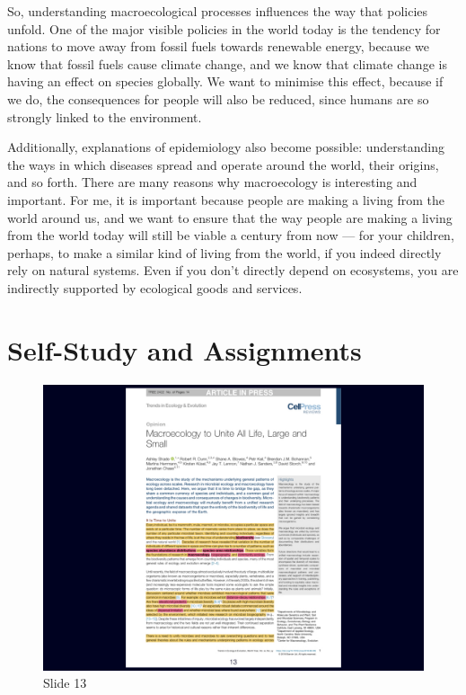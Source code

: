 \documentclass[
  10pt,
]{book}
\begin{document}
So, understanding macroecological processes influences the way that
policies unfold. One of the major visible policies in the world today is
the tendency for nations to move away from fossil fuels towards
renewable energy, because we know that fossil fuels cause climate
change, and we know that climate change is having an effect on species
globally. We want to minimise this effect, because if we do, the
consequences for people will also be reduced, since humans are so
strongly linked to the environment.

Additionally, explanations of epidemiology also become possible:
understanding the ways in which diseases spread and operate around the
world, their origins, and so forth. There are many reasons why
macroecology is interesting and important. For me, it is important
because people are making a living from the world around us, and we want
to ensure that the way people are making a living from the world today
will still be viable a century from now --- for your children, perhaps,
to make a similar kind of living from the world, if you indeed directly
rely on natural systems. Even if you don't directly depend on
ecosystems, you are indirectly supported by ecological goods and
services.

\section{Self-Study and Assignments}\label{self-study-and-assignments}

\begin{figure}[ht]
\centering
\includegraphics[width=0.8\linewidth]{../images/BDC334/BDC334-013.jpeg}
\caption*{Slide 13}
\end{figure}
\end{document}
